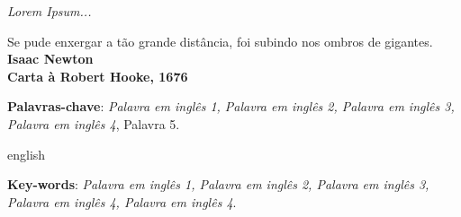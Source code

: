 
\newpage
\vspace*{\fill}
\begin{flushright}
		\textit{Lorem Ipsum...}
\end{flushright}

\begin{agradecimentos}

\lipsum[2-4]

\end{agradecimentos}

\begin{epigrafe}
    \vspace*{\fill}
	\begin{flushright}
		Se pude enxergar a tão grande distância, foi subindo nos ombros de gigantes.\\
		 \vspace{\baselineskip}
		\textbf{Isaac Newton}\\
		\textbf{Carta à Robert Hooke, 1676}
	\end{flushright}
\end{epigrafe}



\setlength{\absparsep}{18pt} %
\begin{resumo}

\lipsum[1-2]

 \textbf{Palavras-chave}: \textit{Palavra em inglês 1, Palavra em inglês 2, Palavra em inglês 3, Palavra em inglês 4}, Palavra 5.

\end{resumo}

\begin{resumo}[Abstract]
\begin{otherlanguage*}{english}

\lipsum[3-4]

	\vspace{\onelineskip}

	\noindent
	\textbf{Key-words}: \textit{Palavra em inglês 1, Palavra em inglês 2, Palavra em inglês 3, Palavra em inglês 4, Palavra em inglês 4}.

\end{otherlanguage*}
\end{resumo}


